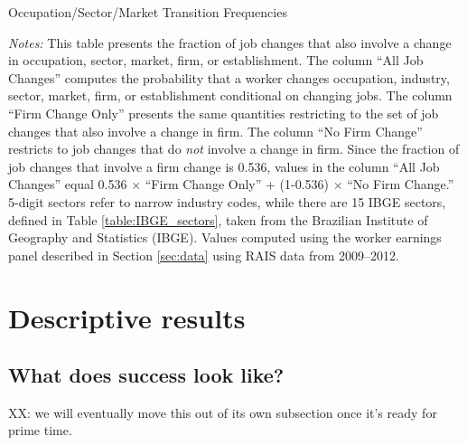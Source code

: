 \documentclass[12pt]{article}
\theoremstyle{definition}
\theoremstyle{plain}
\begin{document}
\begin{table}[h!] \centering
	\caption{Occupation/Sector/Market Transition Frequencies}
	\footnotesize\flushleft \emph{Notes:} This table presents the fraction of job changes that also involve a change in occupation, sector, market, firm, or establishment. The column ``All Job Changes'' computes the probability that a worker changes occupation, industry, sector, market, firm, or establishment conditional on changing jobs. The column ``Firm Change Only'' presents the same quantities restricting to the set of job changes that also involve a change in firm. The column ``No Firm Change'' restricts to job changes that do \emph{not} involve a change in firm. Since the fraction of job changes that involve a firm change is 0.536, values in the column ``All Job Changes'' equal 0.536 $\times$ ``Firm Change Only'' + (1-0.536) $\times$ ``No Firm Change.'' 5-digit sectors refer to narrow industry codes, while there are 15 IBGE sectors, defined in Table \ref{table:IBGE_sectors}, taken from the Brazilian Institute of Geography and Statistics (IBGE). Values computed using the worker earnings panel described in Section \ref{sec:data} using RAIS data from 2009--2012. 
	\label{table:transitions_table}
\end{table}



\section{Descriptive results}
\label{sec:descriptive_results}


\subsection{What does success look like?}

XX: we will eventually move this out of its own subsection once it's ready for prime time.
\end{document}
